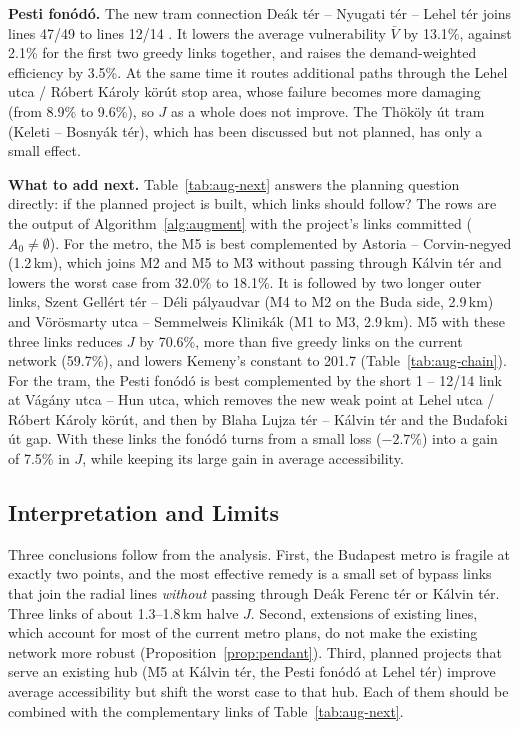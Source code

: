 \documentclass[12pt,a4paper]{article}
\theoremstyle{plain}
\theoremstyle{definition}
\theoremstyle{remark}
\begin{document}
\textbf{Pesti fonód\'o.}  The new tram connection Deák tér -- Nyugati tér --
Lehel tér joins lines 47/49 to lines 12/14 \citep{telex_fonodo2024,bkk_fonodo2025}.
It lowers the average vulnerability $\bar V$ by
13.1\%, against 2.1\% for the first two greedy links together, and raises the
demand-weighted efficiency by 3.5\%.  At the same time it
routes additional paths through the Lehel utca / R\'obert K\'aroly k\"or\'ut
stop area, whose failure becomes more damaging (from 8.9\% to 9.6\%), so $J$
as a whole does not improve.  The Th\"ok\"oly \'ut tram (Keleti -- Bosny\'ak
t\'er), which has been discussed but not planned, has only a small effect.



\textbf{What to add next.}  Table~\ref{tab:aug-next} answers the planning
question directly: if the planned project is built, which links should follow?
The rows are the output of Algorithm~\ref{alg:augment} with the project's
links committed ($A_0\ne\emptyset$).  For the metro, the M5 is best complemented by Astoria -- Corvin-negyed
(1.2\,km), which joins M2 and M5 to M3 without passing through K\'alvin t\'er
and lowers the worst case from 32.0\% to 18.1\%.  It is followed by two longer
outer links, Szent Gell\'ert t\'er -- D\'eli p\'alyaudvar (M4 to M2 on the Buda
side, 2.9\,km) and V\"or\"osmarty utca -- Semmelweis Klinik\'ak (M1 to M3,
2.9\,km).  M5 with these three links reduces $J$ by 70.6\%, more than five
greedy links on the current network (59.7\%), and lowers Kemeny's constant to
201.7 (Table~\ref{tab:aug-chain}).  For the tram, the Pesti fonód\'o is best
complemented by the short 1 -- 12/14 link at V\'ag\'any utca -- Hun utca, which
removes the new weak point at Lehel utca / R\'obert K\'aroly k\"or\'ut, and then
by Blaha Lujza t\'er -- K\'alvin t\'er and the Budafoki \'ut gap.  With these
links the fonód\'o turns from a small loss ($-2.7\%$) into a gain of 7.5\% in
$J$, while keeping its large gain in average accessibility.

\subsection{Interpretation and Limits}

Three conclusions follow from the analysis.  First, the Budapest metro is
fragile at exactly two points, and the most effective remedy is a small set
of bypass links that join the radial lines \emph{without} passing through
De\'ak Ferenc t\'er or K\'alvin t\'er.  Three links of about 1.3--1.8\,km
halve $J$.  Second, extensions of existing lines, which account for most of
the current metro plans, do not make the existing network more robust
(Proposition~\ref{prop:pendant}).  Third, planned projects that serve an
existing hub (M5 at K\'alvin t\'er, the Pesti fonód\'o at Lehel t\'er) improve
average accessibility but shift the worst case to that hub.  Each of them
should be combined with the complementary links of Table~\ref{tab:aug-next}.
\end{document}
